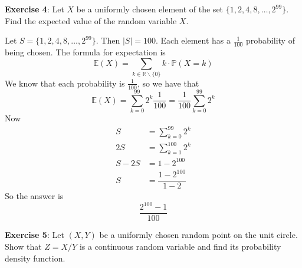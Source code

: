 \documentclass{article}
\begin{document}
\textbf{Exercise 4}: Let $X$ be a uniformly chosen element of the set $\{1, 2, 4, 8, \ldots, 2^{99}\}$. Find the expected value of the random variable $X$.
    \begin{answer}
        Let $S = \{1, 2, 4, 8, \ldots, 2^{99}\}$. Then $\lvert S \rvert = 100$. Each element has a $\frac{1}{100}$ probability of being chosen. The formula for expectation is
            \begin{equation*}
                \mathbb{E}(X) = \sum_{k \in \mathbb{R} \backslash \{0\}} k \cdot \mathbb{P}(X = k)
            \end{equation*}
        We know that each probability is $\frac{1}{100}$, so we have that
            \begin{equation*}
                \mathbb{E}(X) = \sum_{k = 0}^{99}2^{k}\dfrac{1}{100} = \dfrac{1}{100}\sum_{k = 0}^{99}2^{k}
            \end{equation*}
        Now 
            \begin{align*}
                S      &= \sum_{k = 0}^{99}2^{k}     \\
                2S     &= \sum_{k = 1}^{100}2^{k}    \\
                S - 2S &= 1 - 2^{100}                \\
                S      &= \dfrac{1 - 2^{100}}{1 - 2}   
            \end{align*}
        So the answer is 
            \begin{equation*}
                \dfrac{2^{100} - 1}{100}
            \end{equation*}
    \end{answer}

\textbf{Exercise 5}: Let $(X, Y)$ be a uniformly chosen random point on the unit circle. Show that $Z = X/Y$ is a continuous random variable and find its probability density function.
\end{document}
